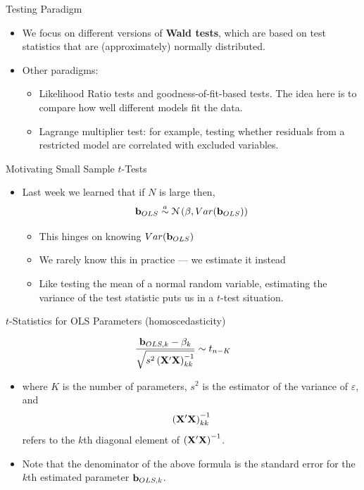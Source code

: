 \documentclass[aspectratio=169,11pt]{beamer}
\begin{document}
\begin{frame}{Testing Paradigm}
\begin{itemize}

	\item We focus on different versions of {\bf Wald tests}, which are based on test 
	statistics that are (approximately) normally distributed.

	\medskip
	\item Other paradigms:
	\begin{itemize}
		\item Likelihood Ratio tests and goodness-of-fit-based tests. The idea here is to compare how well
		different models fit the data.

		\item Lagrange multiplier test: for example, testing whether residuals from a restricted model are
		correlated with excluded variables. 
	\end{itemize}
\end{itemize}
\end{frame}


\begin{frame}{Motivating Small Sample $t$-Tests}
\begin{itemize}
	\item Last week we learned that if $N$ is large then,
	\[
		{\bf b}_{OLS} \stackrel{a}{\sim}\mathcal{N}\left(\beta,Var({\bf b}_{OLS})\right)
	\]
	\begin{itemize}
		\item This hinges on knowing $Var({\bf b}_{OLS})$
		\item We rarely know this in practice --- we estimate it instead
		\item Like testing the mean of a normal random variable, estimating the variance
		of the test statistic puts us in a $t$-test situation.
	\end{itemize}
\end{itemize}
\end{frame}

\begin{frame}{$t$-Statistics for OLS Parameters (homoscedasticity)}

\[
\frac{{\bf b}_{OLS,k} - \beta_k}{\sqrt{s^2 \left( {\bf X}' {\bf X}\right)^{-1}_{kk}}} \sim t_{n-K}
\]

\begin{itemize}
	\item where $K$ is the number of parameters,  $s^2$ is the estimator of
	the variance of $\varepsilon$, and \[
	\left( {\bf X}' {\bf X}\right)^{-1}_{kk}
	\]
	refers to the $k$th diagonal element of $\left( {\bf X}' {\bf X}\right)^{-1}$.

	\item Note that the denominator of the above formula is the standard error for the $k$th
	estimated parameter ${\bf b}_{OLS,k} $.

\end{itemize}
\end{frame}
\end{document}
